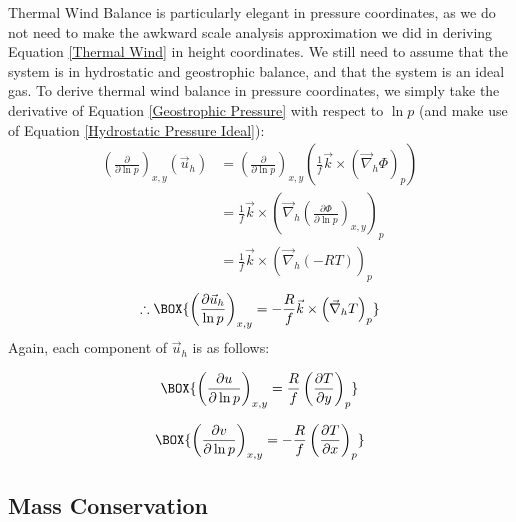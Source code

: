 Thermal Wind Balance is particularly elegant in pressure coordinates, as we do not need to make the awkward scale analysis approximation we did in deriving Equation \ref{Thermal Wind} in height coordinates. We still need to assume that the system is in hydrostatic and geostrophic balance, and that the system is an ideal gas. To derive thermal wind balance in pressure coordinates, we simply take the derivative of Equation \ref{Geostrophic Pressure} with respect to $\ln p$ (and make use of Equation \ref{Hydrostatic Pressure Ideal}):
\begin{align*}
    \left( \frac{\partial}{\partial \ln p} \right)_{x,y}\left( \vec{u}_h \right)
    &= \left( \frac{\partial}{\partial \ln p} \right)_{x,y}
    \left( \frac{1}{f}\vec{k}\times\left( \vec{\nabla}_h \Phi \right)_p \right)
    \\
    &= \frac{1}{f}\vec{k}\times\left( \vec{\nabla}_h \left( \frac{\partial \Phi}{\partial \ln p} \right)_{x,y} \right)_{p}
    \\
    &= \frac{1}{f}\vec{k}\times\left( \vec{\nabla}_h (-RT) \right)_{p}
\end{align*}
\begin{align}
    \therefore
    \BOX{
        \left( \frac{\partial \vec{u}_h}{\ln p} \right)_{x,y}
        =
        -\frac{R}{f}\vec{k}\times \left( \vec{\nabla}_h T \right)_p
    }
\end{align}
Again, each component of $\vec{u}_h$ is as follows:

\begin{minipage}{.48\linewidth}
    \begin{align*}
        \BOX{
            \left( \frac{\partial u}{\partial \ln p} \right)_{x,y}
            =\frac{R}{f}
            \left( \frac{\partial T}{\partial y} \right)_{p}
        }
    \end{align*}
\end{minipage}
\hfill
\begin{minipage}{.48\linewidth}
    \begin{align*}
        \BOX{
            \left( \frac{\partial v}{\partial \ln p} \right)_{x,y}
            =-\frac{R}{f}
            \left( \frac{\partial T}{\partial x} \right)_{p}
        }
    \end{align*}
\end{minipage}

\subsection{Mass Conservation}

